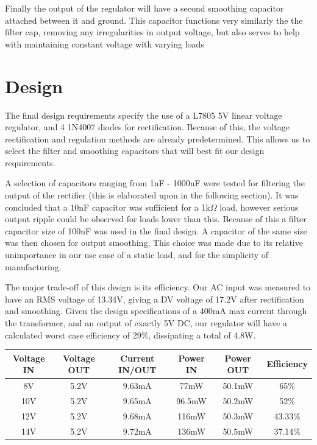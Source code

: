 \documentclass[a4paper,11pt]{article}
\begin{document}
Finally the output of the regulator will have a second smoothing capacitor attached between it and ground. This capacitor functions very similarly the the filter cap, removing any irregularities in output voltage, but also serves to help with maintaining constant voltage with varying loads 

\section{Design}

The final design requirements specify the use of a L7805 5V linear voltage regulator, and 4 1N4007 diodes for rectification. Because of this, the voltage rectification and regulation methods are already predetermined. This allows us to select the filter and smoothing capacitors that will best fit our design requirements.
 
A selection of capacitors ranging from 1nF - 1000nF were tested for filtering the output of the rectifier (this is elaborated upon in the following section). It was concluded that a 10nF capacitor was sufficient for a 1k$\Omega$ load, however serious output ripple could be observed for loads lower than this. Because of this a filter capacitor size of 100nF was used in the final design. A capacitor of the same size was then chosen for output smoothing, This choice was made due to its relative unimportance in our use case of a static load, and for the simplicity of manufacturing. 

The major trade-off of this design is its efficiency. Our AC input was measured to have an RMS voltage of 13.34V, giving a DV voltage of 17.2V after rectification and smoothing. Given the design specifications of a 400mA max current through the transformer, and an output of exactly 5V DC, our regulator will have a calculated worst case efficiency of 29\%, dissipating a total of 4.8W. 


\begin{center}
\begin{tabular}{|c|c|c|c|c|c|}  
\hline
Voltage IN & Voltage OUT & Current IN/OUT & Power IN & Power OUT & Efficiency\\
\hline
8V & 5.2V & 9.63mA & 77mW & 50.1mW & 65\%\\
10V & 5.2V & 9.65mA & 96.5mW & 50.2mW & 52\%\\
12V & 5.2V & 9.68mA & 116mW & 50.3mW & 43.33\%\\
14V & 5.2V & 9.72mA & 136mW & 50.5mW & 37.14\%\\
\hline
\end{tabular}
\end{center}
\end{document}
